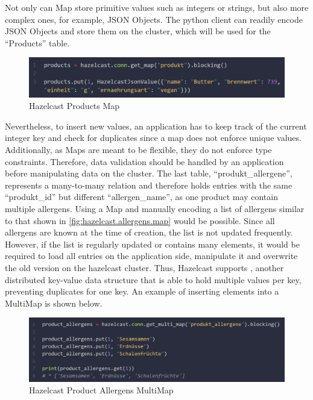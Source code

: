 Not only can Map store primitive values such as integers or strings, but also more complex ones, for 
example, JSON Objects. The python client can readily encode JSON Objects and store them on the cluster, 
which will be used for the \enquote{Products} table.
\parencite{Hazelcast.PythonClient.HazelcastJsonValue}

\begin{figure}[H]
    \includegraphics[width=1\textwidth]{images/hazelcast.products.map.png}
    \caption{Hazelcast Products Map} \label{fig:hazelcast.products.map}
\end{figure}

Nevertheless, to insert new values, an application has to keep track of the current integer key and check 
for duplicates since a map does not enforce unique values. Additionally, as Maps are meant to be flexible, 
they do not enforce type constraints. Therefore, data validation should be handled by an application before 
manipulating data on the cluster.
The last table, \enquote{produkt\_allergene}, 
represents a many-to-many relation and therefore holds entries with the 
same \enquote{produkt\_id} but different \enquote{allergen\_name}, as one product may contain multiple allergens.
Using a Map and manually encoding a list of allergens similar to that shown in \autoref{fig:hazelcast.allergens.map} 
would be possible. Since all allergens are known at the time of creation, the 
list is not updated frequently. However, if the list is regularly updated or contains many elements, it 
would be required to load all entries on the application side, manipulate it and overwrite the old version 
on the hazelcast cluster. 
Thus, Hazelcast supports \textcite{Hazelcast.DataStructure.MultiMap}, another distributed key-value data structure that is able to hold 
multiple values per key, preventing duplicates for one key. 
An example of inserting elements into a MultiMap is shown below.

\begin{figure}[H]
    \includegraphics[width=1\textwidth]{images/hazelcast.product_allergens.multimap.1.png}
    \caption{Hazelcast Product Allergens MultiMap} \label{fig:hazelcast.product_allergens.1.multimap}
\end{figure}

